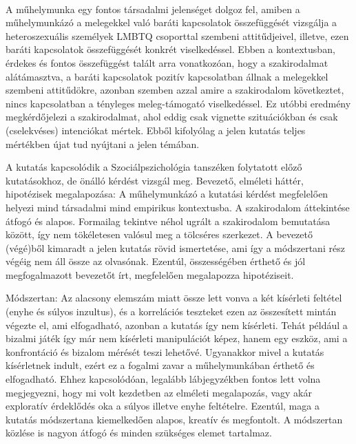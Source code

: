 \\
\par A műhelymunka egy fontos társadalmi jelenséget dolgoz fel, amiben a műhelymunkázó a
melegekkel való baráti kapcsolatok összefüggését vizsgálja a heteroszexuális személyek
LMBTQ csoporttal szembeni attitűdjeivel, illetve, ezen baráti kapcsolatok összefüggését konkrét
viselkedéssel. Ebben a kontextusban, érdekes és fontos összefüggést talált arra vonatkozóan,
hogy a szakirodalmat alátámasztva, a baráti kapcsolatok pozitív kapcsolatban állnak a
melegekkel szembeni attitűdökre, azonban szemben azzal amire a szakirodalom következtet,
nincs kapcsolatban a tényleges meleg-támogató viselkedéssel. Ez utóbbi eredmény
megkérdőjelezi a szakirodalmat, ahol eddig csak vignette szituációkban és csak (cselekvéses)
intenciókat mértek. Ebből kifolyólag a jelen kutatás teljes mértékben újat tud nyújtani a jelen
témában.
\\
\par A kutatás kapcsolódik a Szociálpszichológia tanszéken folytatott előző kutatásokhoz, de önálló
kérdést vizsgál meg.
Bevezető, elméleti háttér, hipotézisek megalapozása: A műhelymunkázó a kutatási kérdést
megfelelően helyezi mind társadalmi mind empirikus kontextusba. A szakirodalom
áttekintése átfogó és alapos. Formailag tekintve néhol ugrált a szakirodalom bemutatása
között, így nem tökéletesen valósul meg a tölcséres szerkezet. A bevezető (végé)ből
kimaradt a jelen kutatás rövid ismertetése, ami így a módszertani rész végéig nem áll össze
az olvasónak. Ezentúl, összességében érthető és jól megfogalmazott bevezetőt írt,
megfelelően megalapozza hipotéziseit.
\\
\par Módszertan: Az alacsony elemszám miatt össze lett vonva a két kísérleti feltétel (enyhe és súlyos
inzultus), és a korrelációs teszteket ezen az összesített mintán végezte el, ami elfogadható,
azonban a kutatás így nem kísérleti. Tehát például a bizalmi játék így már nem kísérleti
manipulációt képez, hanem egy eszköz, ami a konfrontáció és bizalom mérését teszi
lehetővé. Ugyanakkor mivel a kutatás kísérletnek indult, ezért ez a fogalmi zavar a
műhelymunkában érthető és elfogadható. Ehhez kapcsolódóan, legalább lábjegyzékben
fontos lett volna megjegyezni, hogy mi volt kezdetben az elméleti megalapozás, vagy akár
exploratív érdeklődés oka a súlyos illetve enyhe feltételre. Ezentúl, maga a kutatás
módszertana kiemelkedően alapos, kreatív és megfontolt. A módszertan közlése is nagyon
átfogó és minden szükséges elemet tartalmaz.
\\
